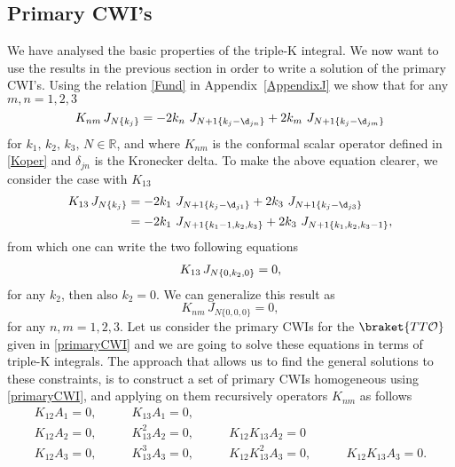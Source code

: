 \documentclass[a4paper,11pt,openright,twoside]{book}
\newcommand{\mO}{\mathcal{O}}
\newcommand{\appref}[1]{Appendix~\ref{#1}}		%
\numberwithin{equation}{section}
\begin{document}
{{{\subsection{Primary CWI's}\label{primarysol}
We have analysed the basic properties of the triple-K integral. We now want to use the results in the previous section in order to write a solution of the primary CWI's. Using the relation \eqref{Fund} in \appref{AppendixJ} we show that for any $m,n=1,2,3$ 
\begin{equation}
	K_{nm}\,J_{N\{k_j\}}=-2k_n\ J_{N+1\{k_j-\d_{jn}\}}+2k_m\ J_{N+1\{k_j-\d_{jm}\}}\label{sol1}
\end{equation}
for $k_1,\,k_2,\,k_3,\,N\in\mathbb R$, and where $K_{nm}$ is the conformal scalar operator defined in \eqref{Koper} and $\delta_{jn}$ is the Kronecker delta. To make the above equation clearer, we consider the case with $K_{13}$ 
\begin{align}
	K_{13}\,J_{N\{k_j\}}&=-2k_1\ J_{N+1\{k_j-\d_{j1}\}}+2k_3\ J_{N+1\{k_j-\d_{j3}\}}\notag\\
	&=-2k_1\ J_{N+1\{k_1-1,k_2,k_3\}}+2k_3\ J_{N+1\{k_1,k_2,k_3-1\}},
\end{align}
from which one can write the two following equations
\begin{align}
	&K_{13}\,J_{N\{0,k_2,0\}}=0,\notag\\
\end{align}
for any $k_2$, then also $k_2=0$. We can generalize this result as
\begin{equation}
	K_{nm}\,J_{N\{0,0,0\}}=0,
\end{equation}  
for any $n,m=1,2,3$. Let us consider the primary CWIs for the $\braket{TT\mO}$ given in \eqref{primaryCWI} and we are going to solve these equations in terms of triple-K integrals. The approach that allows us to find the general solutions to these constraints, is to construct a set of primary CWIs homogeneous using \eqref{primaryCWI}, and applying on them recursively operators $K_{nm}$ as follows
\begin{equation}
	\begin{matrix}
		K_{12}A_1=0,&\qquad K_{13}A_1=0,&\qquad\\[1.2ex]
		K_{12}A_2=0,&\qquad K_{13}^2A_2=0,&\qquad K_{12}K_{13}A_2=0\\[1.2ex]
		K_{12}A_3=0,&\qquad K_{13}^3A_3=0,&\qquad K_{12}K^2_{13}A_3=0,&\qquad K_{12}K_{13}A_3=0.\\
	\end{matrix}\label{homog}
\end{equation}

}}}
\end{document}

